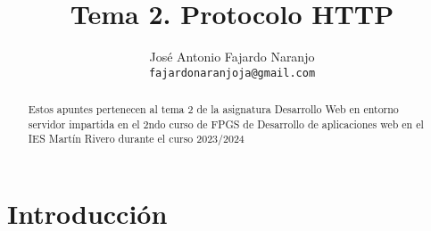 \documentclass{article}
\title{Tema 2. Protocolo HTTP}
\author{José Antonio Fajardo Naranjo \\
	\small
	\tt{fajardonaranjoja@gmail.com} \\
	\date{}
}
\begin{document}
	\maketitle
	\begin{abstract} 
		\noindent Estos apuntes pertenecen al tema 2 de la asignatura Desarrollo Web en entorno servidor impartida en el 2ndo curso de FPGS de Desarrollo de aplicaciones web en el IES Martín Rivero durante el curso 2023/2024  \end{abstract}
	\newpage{\ }
	\tableofcontents
	\newpage{\ }
	\thispagestyle{empty}
	
	

	\section{Introducción}

	
\end{document}
